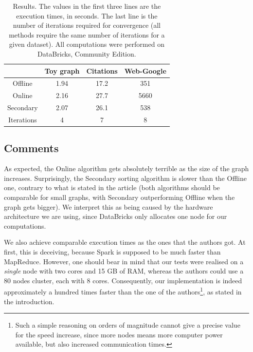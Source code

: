 \documentclass[a4paper,12pt]{article}
\begin{document}
\begin{table}
    \centering
    \begin{tabular}{c|ccc}
    \hline\hline
            & Toy graph & Citations & Web-Google\\
    \hline
    Offline & 1.94 & 17.2 & 351\\
    Online & 2.16 & 27.7 & 5660\\
    Secondary & 2.07 & 26.1 & 538\\
    Iterations & 4 & 7 & 8\\
    \hline\hline
    \end{tabular}
    \caption{Results. The values in the first three lines are the execution times, in seconds. The last line is the number of iterations required for convergence (all methods require the same number of iterations for a given dataset). All computations were performed on DataBricks, Community Edition.}
    \label{tab:results}
\end{table}

\subsection{Comments}
As expected, the Online algorithm gets absolutely terrible as the size of the graph increases. Surprisingly, the Secondary sorting algorithm is slower than the Offline one, contrary to what is stated in the article (both algorithms should be comparable for small graphs, with Secondary outperforming Offline when the graph gets bigger). We interpret this as being caused by the hardware architecture we are using, since DataBricks only allocates one node for our computations.\par
We also achieve comparable execution times as the ones that the authors got. At first, this is deceiving, because Spark is supposed to be much faster than MapReduce. However, one should bear in mind that our tests were realised on a \emph{single} node with two cores and 15 GB of RAM, whereas the authors could use a 80 nodes cluster, each with 8 cores. Consequently, our implementation is indeed approximately a hundred times faster than the one of the authors\footnote{Such a simple reasoning on orders of magnitude cannot give a precise value for the speed increase, since more nodes means more computer power available, but also increased communication times.}, as stated in the introduction.
\end{document}
